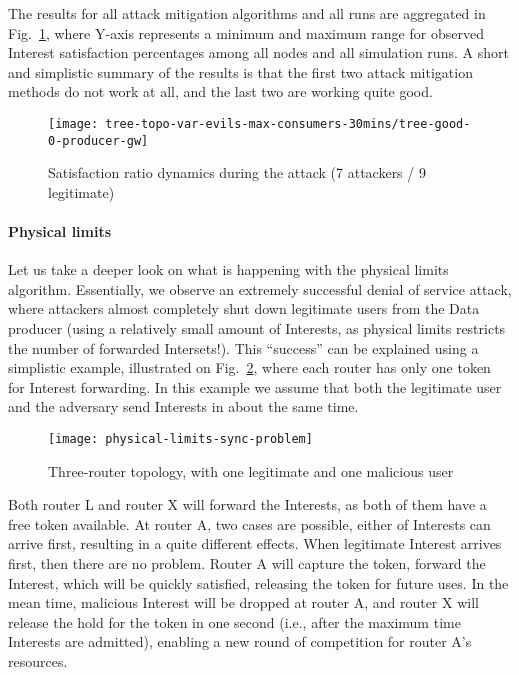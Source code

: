 The results for all attack mitigation algorithms and all runs are aggregated in Fig.~\ref{fig:small-scale attack progress}, where Y-axis represents a minimum and maximum range for observed Interest satisfaction percentages among all nodes and all simulation runs.
A short and simplistic summary of the results is that the first two attack mitigation methods do not work at all, and the last two are working quite good.

\begin{figure}[t]
  \centering
  \texttt{[image: tree-topo-var-evils-max-consumers-30mins/tree-good-0-producer-gw]}
  \caption{Satisfaction ratio dynamics during the attack (7 attackers / 9 legitimate)}
  \label{fig:small-scale attack progress}
\end{figure}

\paragraph{\textbf{Physical limits}}

Let us take a deeper look on what is happening with the physical limits algorithm.
Essentially, we observe an extremely successful denial of service attack, where attackers almost completely shut down legitimate users from the Data producer (using a relatively small amount of Interests, as physical limits restricts the number of forwarded Intersets!).
This ``success'' can be explained using a simplistic example, illustrated on Fig.~\ref{fig:three router example}, where each router has only one token for Interest forwarding.
In this example we assume that both the legitimate user and the adversary send Interests in about the same time.

\begin{figure}[t]
  \centering
  \texttt{[image: physical-limits-sync-problem]}
  \caption{Three-router topology, with one legitimate and one malicious user}
  \label{fig:three router example}
\end{figure}

Both router L and router X will forward the Interests, as both of them have a free token available.
At router A, two cases are possible, either of Interests can arrive first, resulting in a quite different effects.
When legitimate Interest arrives first, then there are no problem. 
Router A will capture the token, forward the Interest, which will be quickly satisfied, releasing the token for future uses.
In the mean time, malicious Interest will be dropped at router A, and router X will release the hold for the token in one second (i.e., after the maximum time Interests are admitted), enabling a new round of competition for router A's resources.

